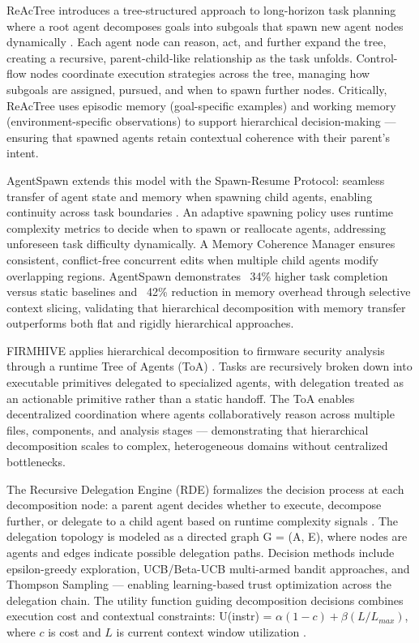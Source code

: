 ReAcTree introduces a tree-structured approach to long-horizon task planning where a root agent decomposes goals into subgoals that spawn new agent nodes dynamically \cite{reactree2025}. Each agent node can reason, act, and further expand the tree, creating a recursive, parent-child-like relationship as the task unfolds. Control-flow nodes coordinate execution strategies across the tree, managing how subgoals are assigned, pursued, and when to spawn further nodes. Critically, ReAcTree uses episodic memory (goal-specific examples) and working memory (environment-specific observations) to support hierarchical decision-making — ensuring that spawned agents retain contextual coherence with their parent's intent.

AgentSpawn extends this model with the Spawn-Resume Protocol: seamless transfer of agent state and memory when spawning child agents, enabling continuity across task boundaries \cite{agentspawn2025}. An adaptive spawning policy uses runtime complexity metrics to decide when to spawn or reallocate agents, addressing unforeseen task difficulty dynamically. A Memory Coherence Manager ensures consistent, conflict-free concurrent edits when multiple child agents modify overlapping regions. AgentSpawn demonstrates ~34\% higher task completion versus static baselines and ~42\% reduction in memory overhead through selective context slicing, validating that hierarchical decomposition with memory transfer outperforms both flat and rigidly hierarchical approaches.

FIRMHIVE applies hierarchical decomposition to firmware security analysis through a runtime Tree of Agents (ToA) \cite{firmhive2025}. Tasks are recursively broken down into executable primitives delegated to specialized agents, with delegation treated as an actionable primitive rather than a static handoff. The ToA enables decentralized coordination where agents collaboratively reason across multiple files, components, and analysis stages — demonstrating that hierarchical decomposition scales to complex, heterogeneous domains without centralized bottlenecks.

The Recursive Delegation Engine (RDE) formalizes the decision process at each decomposition node: a parent agent decides whether to execute, decompose further, or delegate to a child agent based on runtime complexity signals \cite{rde2025}. The delegation topology is modeled as a directed graph G = (A, E), where nodes are agents and edges indicate possible delegation paths. Decision methods include epsilon-greedy exploration, UCB/Beta-UCB multi-armed bandit approaches, and Thompson Sampling — enabling learning-based trust optimization across the delegation chain. The utility function guiding decomposition decisions combines execution cost and contextual constraints: U(instr) = $\alpha(1 - c) + \beta (L / L_{max})$, where $c$ is cost and $L$ is current context window utilization \cite{rde2025}.

